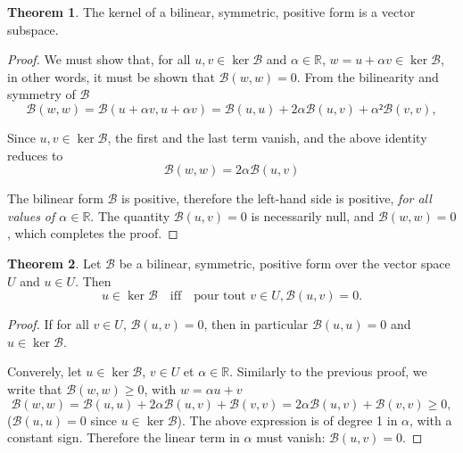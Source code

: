 \documentclass[12pt, final]{scrartcl}
\theoremstyle{definition}
\newtheorem{theorem}{Theorem}
\newcommand{\reals}{\mathbb{R}}
\begin{document}
\begin{theorem}
  The kernel of a bilinear, symmetric, positive form is a vector subspace.
\end{theorem}
\begin{proof}
  We must show that, for all \(u, v ∈\ker \mathcal{B}\) and \(α ∈ \reals\),
  \(w = u + α v ∈ \ker \mathcal{B}\), in other words, it must be shown that
  \(\mathcal{B}(w, w) = 0\). From the bilinearity and symmetry of
  \(\mathcal{B}\)
 \begin{equation*}
   \mathcal{B}(w, w) = \mathcal{B}(u + α v, u + α v)
   = \mathcal{B}(u, u) + 2 α \mathcal{B}(u, v) + α² \mathcal{B}(v, v),
 \end{equation*}

 Since \(u, v ∈ \ker\mathcal{B}\), the first and the last term vanish, and the above identity reduces to
 \begin{equation*}
   \mathcal{B}(w, w) = 2α \mathcal{B}(u, v)
 \end{equation*}

 The bilinear form \(\mathcal{B}\) is positive, therefore the left-hand side is
 positive, \emph{for all values of \(α ∈ \reals\)}. The quantity
 \(\mathcal{B}(u, v) = 0\) is necessarily null, and \(\mathcal{B}(w, w) = 0\),
 which completes the proof.
\end{proof}

\begin{theorem}
  Let \(\mathcal{B}\) be a bilinear, symmetric, positive form over the vector space \(U\) and \(u ∈ U\). Then
 \begin{equation*}
  u ∈ \ker\mathcal{B} \quad \text{iff} \quad \text{pour tout } v ∈ U, \mathcal{B}(u, v) = 0.
 \end{equation*}
\end{theorem}

\begin{proof}
  If for all \(v ∈ U\), \(\mathcal{B}(u, v) = 0\), then in particular
  \(\mathcal{B}(u, u) = 0\) and \(u ∈ \ker \mathcal{B}\).

  Converely, let \(u ∈ \ker \mathcal{B}\), \(v ∈ U\) et \(α ∈
  \reals\). Similarly to the previous proof, we write that
  \(\mathcal{B}(w, w) ≥ 0\), with \(w = α u + v\)
  \begin{equation*}
    \mathcal{B}(w, w) = \mathcal{B}(u, u) + 2 α \mathcal{B}(u, v) +\mathcal{B}(v, v) = 2 α \mathcal{B}(u, v) +\mathcal{B}(v, v) ≥ 0,
  \end{equation*}
  (\(\mathcal{B}(u, u) = 0\) since \(u ∈ \ker \mathcal{B}\)). The above
  expression is of degree 1 in \(α\), with a constant sign. Therefore the linear
  term in \(α\) must vanish: \(\mathcal{B}(u, v) = 0\).
\end{proof}
\end{document}
